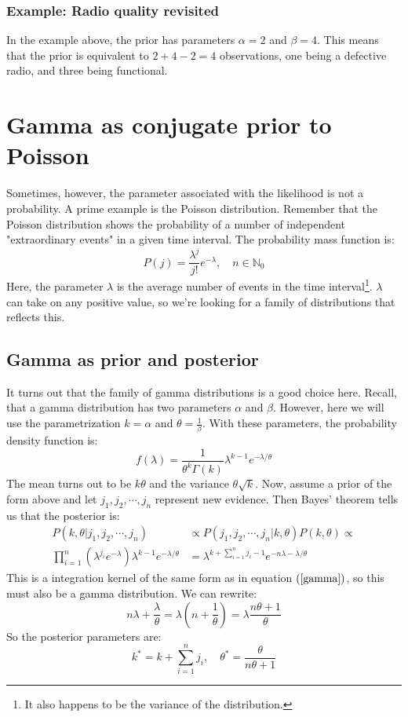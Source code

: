 \documentclass[12pt, a4paper]{article}
\begin{document}
\subsubsection{Example: Radio quality revisited}
In the example above, the prior has parameters $\alpha=2$ and $\beta=4$. This means that the prior is equivalent to $2+4-2=4$ observations, one being a defective radio, and three being functional.

\section{Gamma as conjugate prior to Poisson}
Sometimes, however, the parameter associated with the likelihood is not a probability. A prime example is the Poisson distribution. Remember that the Poisson distribution shows the probability of a number of independent "extraordinary events" in a given time interval. The probability mass function is:
\begin{equation}
P(j)=\frac{\lambda^j}{j!}e^{-\lambda},\quad n\in\mathbb{N}_0
\end{equation}
Here, the parameter $\lambda$ is the average number of events in the time interval\footnote{It also happens to be the variance of the distribution.}. $\lambda$ can take on any positive value, so we're looking for a family of distributions that reflects this.

\subsection{Gamma as prior and posterior}
It turns out that the family of gamma distributions is a good choice here. Recall, that a gamma distribution has two parameters $\alpha$ and $\beta$. However, here we will use the parametrization $k=\alpha$ and $\theta=\frac{1}{\beta}$. With these parameters, the probability density function is:
\begin{equation}
\label{gamma}
f(\lambda)=\frac{1}{\theta^k \Gamma(k)}\lambda^{k-1}e^{-\lambda/\theta}
\end{equation}
The mean turns out to be $k\theta$ and the variance $\theta\sqrt{k}$. Now, assume a prior of the form above and let $j_1, j_2,\cdots,j_n$ represent new evidence. Then Bayes' theorem tells us that the posterior is:
\begin{align}
P(k,\theta|j_1, j_2,\cdots,j_n)&\propto P(j_1, j_2,\cdots,j_n|k,\theta)P(k,\theta)\propto\\
\prod_{i=1}^n\left(\lambda^{j_i}e^{-\lambda}\right)\lambda^{k-1}e^{-\lambda/\theta}&=\lambda^{k+\sum_{i=1}^n j_i-1}e^{-n\lambda-\lambda/\theta}
\end{align}
This is a integration kernel of the same form as in equation $(\ref{gamma})$, so this must also be a gamma distribution. We can rewrite:
\begin{equation}
n\lambda+\frac{\lambda}{\theta}=\lambda\left(n+\frac{1}{\theta}\right)=\lambda\frac{n\theta+1}{\theta}
\end{equation}
So the posterior parameters are:
\begin{equation}
\label{gamma_poisson_posterior}
k^*=k+\sum_{i=1}^n j_i,\quad\theta^*=\frac{\theta}{n\theta+1}
\end{equation}
\end{document}
